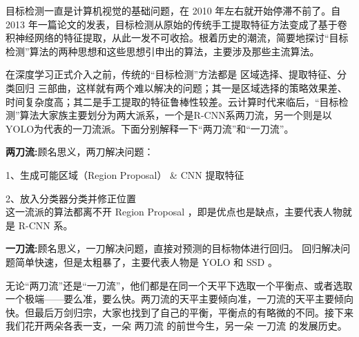 目标检测一直是计算机视觉的基础问题，在 2010 年左右就开始停滞不前了。自 2013 年一篇论文的发表，目标检测从原始的传统手工提取特征方法变成了基于卷积神经网络的特征提取，从此一发不可收拾。根着历史的潮流，简要地探讨“目标检测”算法的两种思想和这些思想引申出的算法，主要涉及那些主流算法。

在深度学习正式介入之前，传统的“目标检测”方法都是 区域选择、提取特征、分类回归 三部曲，这样就有两个难以解决的问题；其一是区域选择的策略效果差、时间复杂度高；其二是手工提取的特征鲁棒性较差。云计算时代来临后，“目标检测”算法大家族主要划分为两大派系，一个是R-CNN系两刀流，另一个则是以YOLO为代表的一刀流派。下面分别解释一下“两刀流”和“一刀流”。

\textbf{两刀流:}顾名思义，两刀解决问题：

1、生成可能区域（Region Proposal） \& CNN 提取特征 

2、放入分类器分类并修正位置 \\
这一流派的算法都离不开 Region Proposal ，即是优点也是缺点，主要代表人物就是 R-CNN 系。

\textbf{一刀流:}顾名思义，一刀解决问题，直接对预测的目标物体进行回归。
回归解决问题简单快速，但是太粗暴了，主要代表人物是 YOLO 和 SSD 。

无论“两刀流”还是“一刀流”，他们都是在同一个天平下选取一个平衡点、或者选取一个极端——要么准，要么快。两刀流的天平主要倾向准，一刀流的天平主要倾向快。但最后万剑归宗，大家也找到了自己的平衡，平衡点的有略微的不同。接下来我们花开两朵各表一支，一朵 两刀流 的前世今生，另一朵 一刀流 的发展历史。


